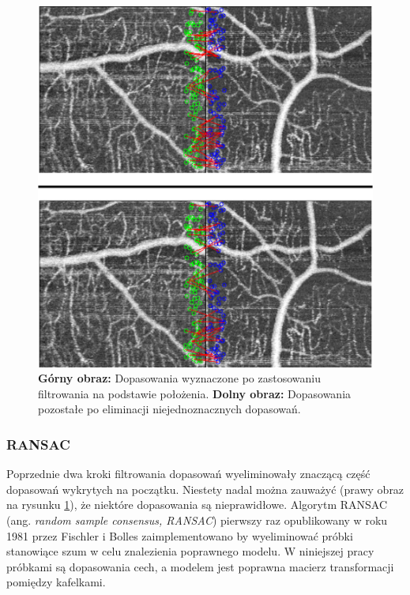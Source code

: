 \begin{figure}[htb]
  \centering
  \includegraphics[width=\textwidth]{gfx/no_repetition_filtering}
  \caption{\textbf{Górny obraz:} Dopasowania wyznaczone po zastosowaniu filtrowania na podstawie położenia. \textbf{Dolny obraz:} Dopasowania pozostałe po eliminacji niejednoznacznych dopasowań.}
  \label{fig:proponowane_algorytmy:no_repetition_filtering}
\end{figure}

\subsubsection{RANSAC}
\label{sec:proponowane_algorytmy:ransac}

Poprzednie dwa kroki filtrowania dopasowań wyeliminowały znaczącą część dopasowań wykrytych na początku. Niestety nadal można zauważyć (prawy obraz na rysunku \ref{fig:proponowane_algorytmy:no_repetition_filtering}), że niektóre dopasowania są nieprawidłowe. Algorytm RANSAC (ang. \textit{random sample consensus, RANSAC}) pierwszy raz opublikowany w roku 1981 przez Fischler i Bolles \cite{Fischler:1981:RSC:358669.358692} zaimplementowano by wyeliminować próbki stanowiące szum w celu znalezienia poprawnego modelu. W niniejszej pracy próbkami są dopasowania cech, a modelem jest poprawna macierz transformacji pomiędzy kafelkami.

